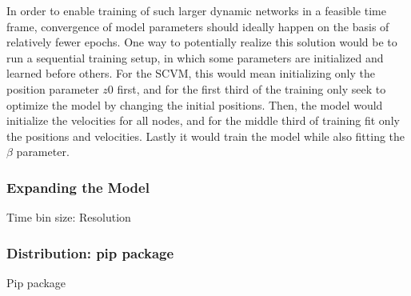 In order to enable training of such larger dynamic networks in a feasible time frame, convergence of model parameters should ideally happen on the basis of relatively fewer epochs.
One way to potentially realize this solution would be to run a sequential training setup, in which some parameters are initialized and learned before others.
For the SCVM, this would mean initializing only the position parameter $z0$ first, and for the first third of the training only seek to optimize the model by changing the initial positions.
Then, the model would initialize the velocities for all nodes, and for the middle third of training fit only the positions and velocities. 
Lastly it would train the model while also fitting the $\beta$ parameter.


\subsubsection{Expanding the Model}
\label{sec:Discussion:FutureWork:ModelExpansion}
Time bin size: Resolution




\subsubsection{Distribution: pip package}
\label{sec:Discussion:FutureWork:Pip}

Pip package

